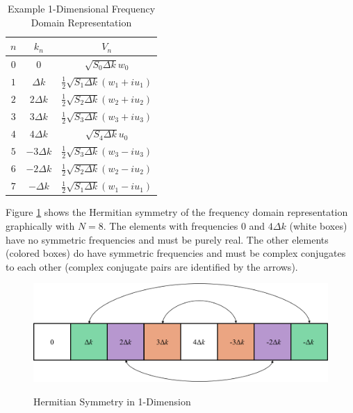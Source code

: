 \begin{table}[H]
  \begin{center}
      \renewcommand{\baselinestretch}{1} \small\normalsize
  \begin{quote}
    \caption[Example 1-Dimensional Frequency Domain Representation]{Example 1-Dimensional Frequency Domain Representation\label{os_tab:2a}}
  \end{quote}
  \begin{tabular} {| c | c | c |}
    \hline
  \bf{$n$} & \bf{$k_n$} & \bf{$V_n$} \\ \hline
  $0$ & $0$ & $\sqrt{S_{0} \Delta k}w_0$ \\ \hline
  $1$ & $\Delta k$ & $\frac{1}{2}\sqrt{S_1 \Delta k} \left(w_1 + iu_1 \right)$ \\ \hline
  $2$ & $2\Delta k$ & $\frac{1}{2}\sqrt{S_2\Delta k} \left(w_2 + iu_2 \right)$ \\ \hline
  $3$ & $3\Delta k$ & $\frac{1}{2}\sqrt{S_3 \Delta k} \left(w_3 + iu_3 \right)$ \\ \hline
  $4$ & $4\Delta k$ & $\sqrt{S_{4} \Delta k} u_0$ \\ \hline
  $5$ & $-3\Delta k$ & $\frac{1}{2}\sqrt{S_3 \Delta k} \left(w_3 - iu_3 \right)$ \\ \hline
  $6$ & $-2\Delta k$ & $\frac{1}{2}\sqrt{S_2 \Delta k} \left(w_2 - iu_2 \right)$  \\ \hline
  $7$ & $-\Delta k$ & $\frac{1}{2}\sqrt{S_1 \Delta k} \left(w_1 - iu_1 \right)$ \\ \hline
\end{tabular}
\end{center}
\end{table}
\renewcommand{\baselinestretch}{2} \small\normalsize

Figure \ref{os_fig:6ab} shows the Hermitian symmetry of the frequency domain representation graphically with $N = 8$. The elements with frequencies $0$ and $4\Delta k$ (white boxes) have no symmetric frequencies and must be purely real. The other elements (colored boxes) do have symmetric frequencies and must be complex conjugates to each other (complex conjugate pairs are identified by the arrows).

\begin{figure}[H]
  \begin{center}
\includegraphics[width=5in]{../media/Ocean_Surface/1-d_hermitian_symmetry.png}
  \end{center}
  \renewcommand{\baselinestretch}{1} \small\normalsize
  \begin{quote}
    \caption[Hermitian Symmetry in 1-Dimension]{Hermitian Symmetry in 1-Dimension\label{os_fig:6ab}}
  \end{quote}
\end{figure}
\renewcommand{\baselinestretch}{2} \small\normalsize

